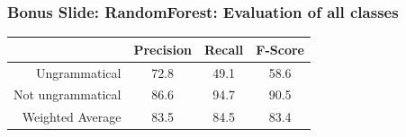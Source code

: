 \documentclass[table]{beamer}
\begin{document}
\begin{frame}
  \frametitle{Bonus Slide: \textbf{RandomForest}: Evaluation of all classes}
  \quad\quad\begin{tabular}{r|c|c|c|}
  & \textbf{Precision} & \textbf{Recall} & \textbf{F-Score}\\
  \hline
  Ungrammatical & 72.8 & 49.1 & 58.6\\
  \hline\pause
  Not ungrammatical & 86.6 & 94.7 & 90.5\\
  \hline
  Weighted Average & 83.5 & 84.5 & 83.4\\
  \hline
  \end{tabular}
\end{frame}

\end{document}
